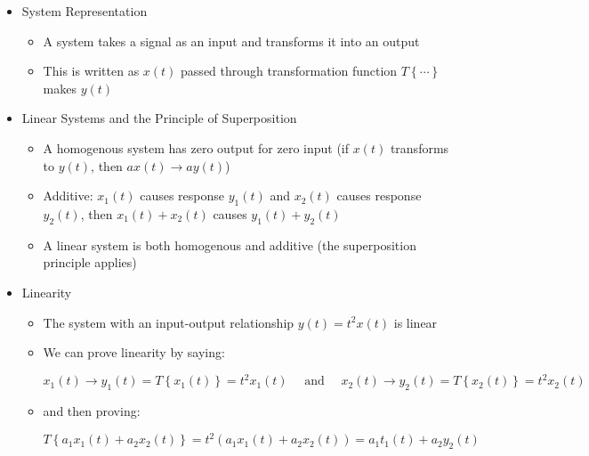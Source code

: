 \begin{itemize}

  \item System Representation

    \begin{itemize}

      \item A system takes a signal as an input and transforms it into an output

      \item This is written as $x(t)$ passed through transformation function $T\left\{ \cdots \right\}$ makes $y(t)$

    \end{itemize}

  \item Linear Systems and the Principle of Superposition

    \begin{itemize}

      \item A homogenous system has zero output for zero input (if $x(t)$ transforms to $y(t)$, then $ax(t)\to ay(t)$)

      \item Additive: $x_1(t)$ causes response $y_1(t)$ and $x_2(t)$ causes response $y_2(t)$, then $x_1(t)+x_2(t)$ causes $y_1(t)+y_2(t)$

      \item A linear system is both homogenous and additive (the superposition principle applies)

    \end{itemize}

  \item Linearity

    \begin{itemize}

      \item The system with an input-output relationship $y(t)=t^2x(t)$ is linear

      \item We can prove linearity by saying:

        $$x_1(t)\to y_1(t)=T\left\{ x_1(t) \right\}=t^2x_1(t)\quad\text{ and }\quad x_2(t)\to y_2(t)=T\left\{ x_2(t) \right\}=t^2x_2(t)$$

      \item and then proving:

        $$T\left\{ a_1x_1(t)+a_2x_2(t) \right\}=t^2(a_1x_1(t)+a_2x_2(t))=a_1t_1(t)+a_2y_2(t)$$



\end{itemize}
\end{itemize}
